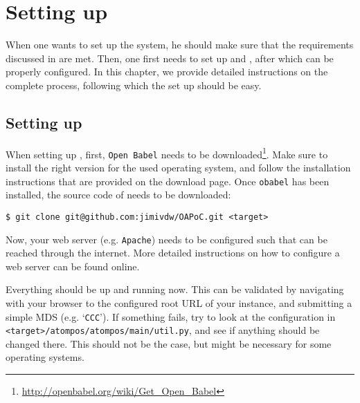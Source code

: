 \chapter{Setting up \oframp}

\lstset{language=sh, frame=single, basicstyle=\ttfamily\small, breaklines=true}

When one wants to set up the \oframp{} system, he should make sure that the requirements discussed in  are met. Then, one first needs to set up \oapoc{} and \omfraf{}, after which \oframp{} can be properly configured. In this chapter, we provide detailed instructions on the complete process, following which the set up should be easy.


\vspace{-.2cm}
\section[\oapoc]{Setting up \oapoc}
\vspace{-.1cm}
When setting up \oapoc, first, \verb|Open Babel| needs to be downloaded\footnote{\url{http://openbabel.org/wiki/Get_Open_Babel}}. Make sure to install the right version for the used operating system, and follow the installation instructions that are provided on the download page. Once \verb|obabel| has been installed, the source code of \oapoc{} needs to be downloaded:
\begin{lstlisting}
$ git clone git@github.com:jimivdw/OAPoC.git <target>
\end{lstlisting}
Now, your web server (e.g. \verb|Apache|) needs to be configured such that \oapoc{} can be reached through the internet. More detailed instructions on how to configure a web server can be found online.

Everything should be up and running now. This can be validated by navigating with your browser to the configured root URL of your \oapoc{} instance, and submitting a simple MDS (e.g. `\texttt{CCC}'). If something fails, try to look at the configuration in \verb|<target>/atompos/atompos/main/util.py|, and see if anything should be changed there. This should not be the case, but might be necessary for some operating systems.



\vspace{-.1cm}

